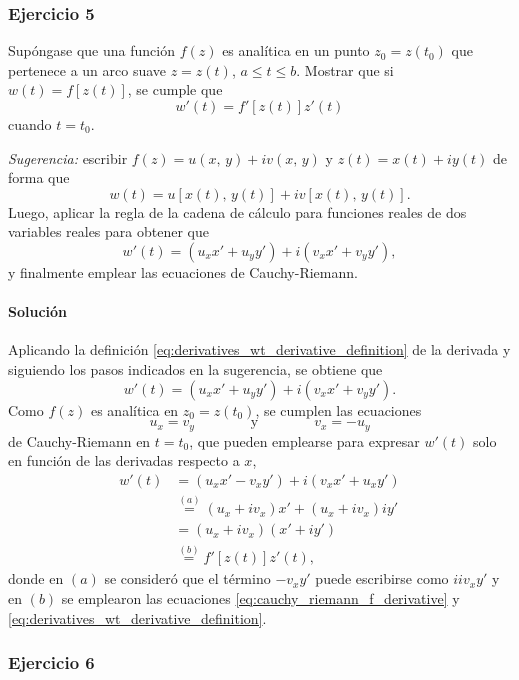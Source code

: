 \documentclass[a4paper]{report}
\begin{document}
\subsubsection{Ejercicio 5}

Supóngase que una función \(f(z)\) es analítica en un punto \(z_0=z(t_0)\) que pertenece a un arco suave \(z=z(t)\), \(a\leq t\leq b\). Mostrar que si \(w(t)=f[z(t)]\), se cumple que 
\[
 w'(t)=f'[z(t)]z'(t)
\]
cuando \(t=t_0\).

\emph{Sugerencia:} escribir \(f(z)=u(x,\,y)+iv(x,\,y)\) y \(z(t)=x(t)+iy(t)\) de forma que 
\[
 w(t)=u[x(t),\,y(t)]+iv[x(t),\,y(t)].
\]
Luego, aplicar la regla de la cadena de cálculo para funciones reales de dos variables reales para obtener que 
\[
 w'(t)=(u_xx'+u_yy')+i(v_xx'+v_yy'),
\]
y finalmente emplear las ecuaciones de Cauchy-Riemann.

\paragraph{Solución} Aplicando la definición \ref{eq:derivatives_wt_derivative_definition} de la derivada y siguiendo los pasos indicados en la sugerencia, se obtiene que 
\[
 w'(t)=(u_xx'+u_yy')+i(v_xx'+v_yy').
\]
Como \(f(z)\) es analítica en \(z_0=z(t_0)\), se cumplen las ecuaciones 
\[
 u_x=v_y
 \qquad\qquad\textrm{y}\qquad\qquad
 v_x=-u_y
\]
de Cauchy-Riemann en \(t=t_0\), que pueden emplearse para expresar \(w'(t)\) solo en función de las derivadas respecto a \(x\),
\begin{align*}
 w'(t)&=(u_xx'-v_xy')+i(v_xx'+u_xy')\\
  &\overset{(a)}{=}(u_x+iv_x)x'+(u_x+iv_x)iy'\\
  &=(u_x+iv_x)(x'+iy')\\
  &\overset{(b)}{=}f'[z(t)]z'(t),
\end{align*}
donde en \((a)\) se consideró que el término \(-v_xy'\) puede escribirse como \(iiv_xy'\) y en \((b)\) se emplearon las ecuaciones \ref{eq:cauchy_riemann_f_derivative} y \ref{eq:derivatives_wt_derivative_definition}.

\subsubsection{Ejercicio 6}
\end{document}
